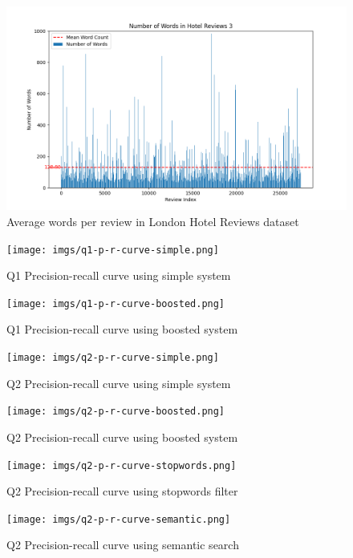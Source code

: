 \documentclass[sigconf]{acmart}
\begin{document}
\begin{figure}[H]
  \centering
  \includegraphics[width=\linewidth]{imgs/word_count_3.png}
  \caption{Average words per review in London Hotel Reviews dataset}
  \label{fig:reviewWords3}
\end{figure}


\begin{figure}[H]
  \centering
  \texttt{[image: imgs/q1-p-r-curve-simple.png]}
  \caption{Q1 Precision-recall curve using simple system}
  \label{fig:q1_simple}
\end{figure}

\begin{figure}[H]
  \centering
  \texttt{[image: imgs/q1-p-r-curve-boosted.png]}
  \caption{Q1 Precision-recall curve using boosted system}
  \label{fig:q1_boosted}
\end{figure}


\begin{figure}[H]
  \centering
  \texttt{[image: imgs/q2-p-r-curve-simple.png]}
  \caption{Q2 Precision-recall curve using simple system}
  \label{fig:q2_simple}
\end{figure}

\begin{figure}[H]
  \centering
  \texttt{[image: imgs/q2-p-r-curve-boosted.png]}
  \caption{Q2 Precision-recall curve using boosted system}
  \label{fig:q2_boosted}
\end{figure}

\begin{figure}[H]
  \centering
  \texttt{[image: imgs/q2-p-r-curve-stopwords.png]}
  \caption{Q2 Precision-recall curve using stopwords filter}
  \label{fig:q2_stopwords}
\end{figure}

\begin{figure}[H]
  \centering
  \texttt{[image: imgs/q2-p-r-curve-semantic.png]}
  \caption{Q2 Precision-recall curve using semantic search}
  \label{fig:q2_semantic}
\end{figure}
\end{document}
